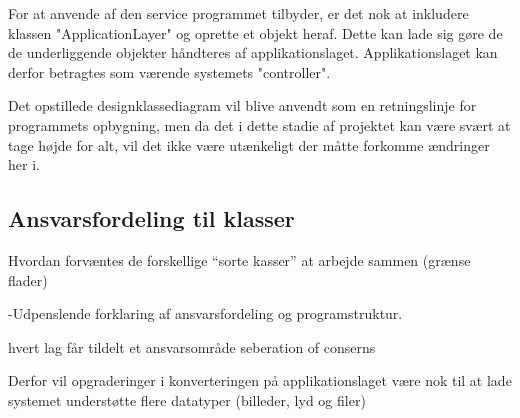 For at anvende af den service programmet tilbyder, er det nok at inkludere klassen "ApplicationLayer" og oprette et objekt heraf. Dette kan lade sig gøre de de underliggende objekter håndteres af applikationslaget. Applikationslaget kan derfor betragtes som værende systemets "controller". 

Det opstillede designklassediagram vil blive anvendt som en retningslinje for programmets opbygning, men da det i dette stadie af projektet kan være svært at tage højde for alt, vil det ikke være utænkeligt der måtte forkomme ændringer her i.


\subsection{Ansvarsfordeling til klasser}
Hvordan forvæntes de forskellige “sorte kasser” at arbejde sammen (grænse flader)

-Udpenslende forklaring af ansvarsfordeling og programstruktur.  

hvert lag får tildelt et ansvarsområde 
seberation of conserns

Derfor vil opgraderinger i konverteringen på applikationslaget være nok til at lade systemet understøtte flere datatyper (billeder, lyd og filer)